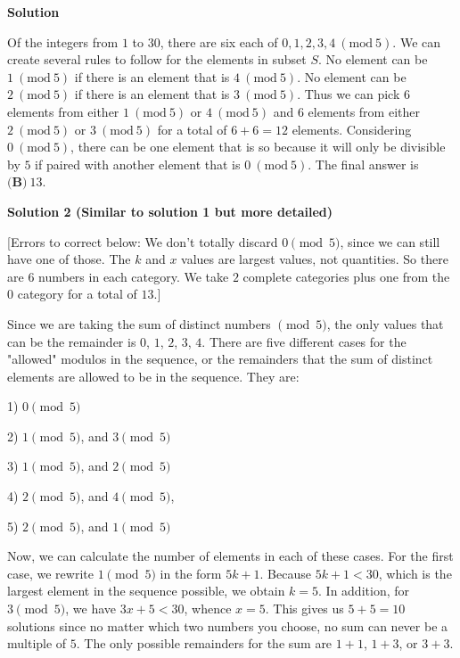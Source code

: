 \begin{enumerate}
\textbf{Solution}

Of the integers from $1$ to $30$, there are six each of $0,1,2,3,4\ (\text{mod}\ 5)$. We can create several rules to follow for the elements in subset $S$. No element can be $1\ (\text{mod}\ 5)$ if there is an element that is $4\ (\text{mod}\ 5)$. No element can be $2\ (\text{mod}\ 5)$ if there is an element that is $3\ (\text{mod}\ 5)$. Thus we can pick 6 elements from either $1\ (\text{mod}\ 5)$ or $4\ (\text{mod}\ 5)$ and 6 elements from either $2\ (\text{mod}\ 5)$ or $3\ (\text{mod}\ 5)$ for a total of $6+6=12$ elements. Considering $0\ (\text{mod}\ 5)$, there can be one element that is so because it will only be divisible by $5$ if paired with another element that is $0\ (\text{mod}\ 5)$. The final answer is $\boxed{\textbf{(B)}\ 13}$.

 


 


 



\textbf{Solution 2 (Similar to solution 1 but more detailed)}

[Errors to correct below: We don't totally discard $0 \pmod{5}$, since we can still have one of those. The $k$ and $x$ values are largest values, not quantities. So there are $6$ numbers in each category.  We take $2$ complete categories plus one from the $0$ category for a total of $13$.]

 Since we are taking the sum of distinct numbers $\pmod{5}$, the only values that can be the remainder is $0$, $1$, $2$, $3$, $4$. There are five different cases for the "allowed" modulos in the sequence, or the remainders that the sum of distinct elements are allowed to be in the sequence. They are:

 1)      $0\pmod{5}$

 
2)      $1\pmod{5}$, and $3\pmod{5}$

 
3)      $1\pmod{5}$, and $2\pmod{5}$

 
4)      $2\pmod{5}$, and $4\pmod{5}$, 

 
5)      $2\pmod{5}$, and $1\pmod{5}$ 

 Now, we can calculate the number of elements in each of these cases. For the first case, we rewrite $1\pmod{5}$ in the form $5k+1$. Because $5k+1 < 30$, which is the largest element in the sequence possible, we obtain $k=5$. In addition, for $3\pmod{5}$, we have $3x+5<30$, whence $x=5$. This gives us $5+5=10$ solutions since no matter which two numbers you choose, no sum can never be a multiple of $5$. The only possible remainders for the sum are $1+1$, $1+3$, or $3+3$. 


\end{enumerate}
